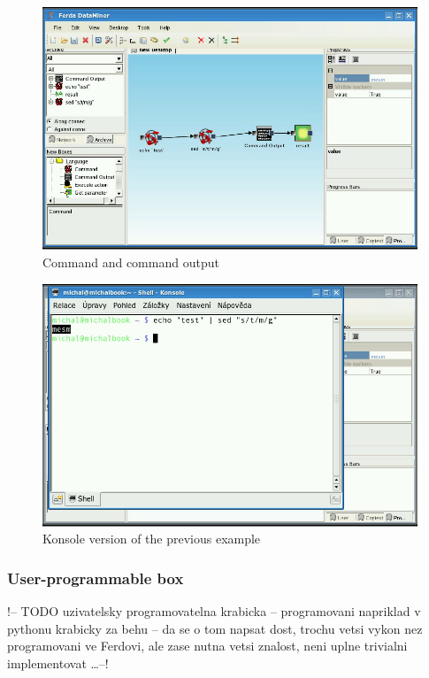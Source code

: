 \documentclass[a4paper,12pt]{book}
\begin{document}
\begin{figure}
	\includegraphics[width=1\textwidth]{command2.png}
	\caption{Command and command output}
	\label{fig:boxCommand}
\end{figure}

\begin{figure}
	\includegraphics[width=1\textwidth]{command3.png}
	\caption{Konsole version of the previous example}
	\label{fig:CommandKonsole}
\end{figure}

\subsubsection{User-programmable box}
!-- TODO uzivatelsky programovatelna krabicka -- programovani napriklad v pythonu krabicky za behu -- da se o tom napsat dost, trochu vetsi vykon nez programovani ve Ferdovi, ale zase nutna vetsi znalost, neni uplne trivialni implementovat \dots  --!
\end{document}
